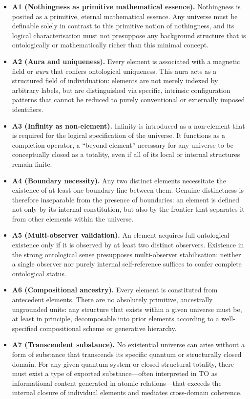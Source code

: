 \documentclass[11pt,a4paper]{article}
\begin{document}
\begin{itemize}
  \item \textbf{A1 (Nothingness as primitive mathematical essence).} Nothingness is posited as a primitive, eternal mathematical essence. Any universe must be definable solely in contrast to this primitive notion of nothingness, and its logical characterisation must not presuppose any background structure that is ontologically or mathematically richer than this minimal concept.

  \item \textbf{A2 (Aura and uniqueness).} Every element is associated with a magnetic field or \emph{aura} that confers ontological uniqueness. This aura acts as a structured field of individuation: elements are not merely indexed by arbitrary labels, but are distinguished via specific, intrinsic configuration patterns that cannot be reduced to purely conventional or externally imposed identifiers.

  \item \textbf{A3 (Infinity as non-element).} Infinity is introduced as a non-element that is required for the logical specification of the universe. It functions as a completion operator, a “beyond-element” necessary for any universe to be conceptually closed as a totality, even if all of its local or internal structures remain finite.

  \item \textbf{A4 (Boundary necessity).} Any two distinct elements necessitate the existence of at least one boundary line between them. Genuine distinctness is therefore inseparable from the presence of boundaries: an element is defined not only by its internal constitution, but also by the frontier that separates it from other elements within the universe.

  \item \textbf{A5 (Multi-observer validation).} An element acquires full ontological existence only if it is observed by at least two distinct observers. Existence in the strong ontological sense presupposes multi-observer stabilisation: neither a single observer nor purely internal self-reference suffices to confer complete ontological status.

  \item \textbf{A6 (Compositional ancestry).} Every element is constituted from antecedent elements. There are no absolutely primitive, ancestrally ungrounded units: any structure that exists within a given universe must be, at least in principle, decomposable into prior elements according to a well-specified compositional scheme or generative hierarchy.

  \item \textbf{A7 (Transcendent substance).} No existential universe can arise without a form of substance that transcends its specific quantum or structurally closed domain. For any given quantum system or closed structural totality, there must exist a type of exported substance—often interpreted in TO as informational content generated in atomic relations—that exceeds the internal closure of individual elements and mediates cross-domain coherence.

\end{itemize}
\end{document}
